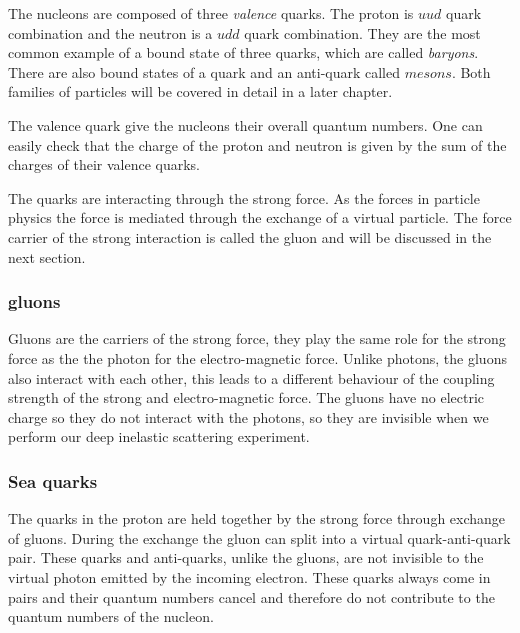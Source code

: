 \documentclass[12pt]{article}
\begin{document}
The nucleons are composed of three \emph{valence} quarks. The proton is $uud$ quark combination and the neutron is a $udd$ quark combination. They are the most common example of a bound state of three quarks, which are called \emph{baryons}. There are also bound states of a quark and an anti-quark called $mesons$. Both families of particles will be covered in detail in a later chapter.   

The valence quark give the nucleons their overall quantum numbers. One can easily check that the charge of the proton and neutron is given by the sum of the charges of their valence quarks.

The quarks are interacting through the strong force. As the forces in particle physics the force is mediated through the exchange of a virtual particle. The force carrier of the strong interaction is called the gluon and will be discussed in the next section.
%
%
\subsubsection{gluons}
%
%
Gluons are the carriers of the strong force, they play the same role for the strong force as the the photon for the electro-magnetic force. Unlike photons, the gluons also interact with each other, this leads to a different behaviour of the coupling strength of the strong and electro-magnetic force. The gluons have no electric charge so they do not interact with the photons, so they are invisible when we perform our deep inelastic scattering experiment.

\subsubsection{Sea quarks}

The quarks in the proton are held together by the strong force through exchange of gluons. During the exchange the gluon can split into a virtual quark-anti-quark pair. These quarks and anti-quarks, unlike the gluons, are not invisible to the virtual photon emitted by the incoming electron. These quarks always come in pairs and their quantum numbers cancel and therefore do not contribute to the quantum numbers of the nucleon.

%
%
%
%
\end{document}
